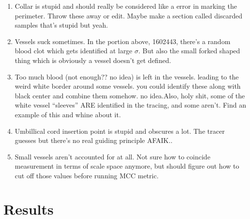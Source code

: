 \begin{enumerate}
\item Collar is stupid and should really be considered like a error in marking the perimeter. Throw these away or edit. Maybe make a section called discarded samples that's stupid but yeah.
\item Vessels suck sometimes. In the portion above, 1602443, there's a random blood clot which gets identified at large $\sigma$. But also the small forked shaped thing which is obviously a vessel doesn't get defined.
\item Too much blood (not enough?? no idea) is left in the vessels. leading to the weird white border around some vessels. you could identify these along with black center and combine them somehow. no idea.Also, holy shit, some of the white vessel ``sleeves'' ARE identified in the tracing, and some aren't. Find an example of this and whine about it.
\item Umbillical cord insertion point is stupid and obscures a lot. The tracer guesses but there's no real guiding principle AFAIK..
\item Small vessels aren't accounted for at all. Not sure how to coincide measurement in terms of scale space anymore, but should figure out how to cut off those values before running MCC metric.
\end{enumerate}





\section{Results}


